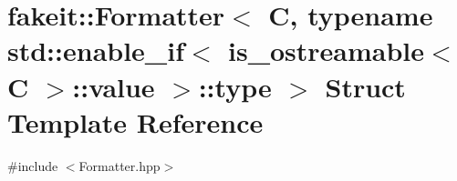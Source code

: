 \hypertarget{structfakeit_1_1Formatter_3_01C_00_01typename_01std_1_1enable__if_3_01is__ostreamable_3_01C_01_4_1_1value_01_4_1_1type_01_4}{}\section{fakeit\+::Formatter$<$ C, typename std\+::enable\+\_\+if$<$ is\+\_\+ostreamable$<$ C $>$\+::value $>$\+::type $>$ Struct Template Reference}
\label{structfakeit_1_1Formatter_3_01C_00_01typename_01std_1_1enable__if_3_01is__ostreamable_3_01C_01_4_1_1value_01_4_1_1type_01_4}


{\ttfamily \#include $<$Formatter.\+hpp$>$}

